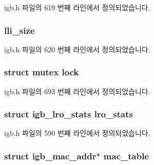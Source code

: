 igb.\+h 파일의 619 번째 라인에서 정의되었습니다.

\subsubsection[{\texorpdfstring{lli\+\_\+size}{lli_size}}]{ lli\+\_\+size}\hypertarget{structigb__adapter_a2316241ef54e8be665bac12c9da109c8}{}\label{structigb__adapter_a2316241ef54e8be665bac12c9da109c8}


igb.\+h 파일의 620 번째 라인에서 정의되었습니다.

\subsubsection[{\texorpdfstring{lock}{lock}}]{\setlength{\rightskip}{0pt plus 5cm}struct mutex lock}\hypertarget{structigb__adapter_af635d65f26e31c345ef21c333feb3910}{}\label{structigb__adapter_af635d65f26e31c345ef21c333feb3910}


igb.\+h 파일의 693 번째 라인에서 정의되었습니다.

\subsubsection[{\texorpdfstring{lro\+\_\+stats}{lro_stats}}]{\setlength{\rightskip}{0pt plus 5cm}struct {\bf igb\+\_\+lro\+\_\+stats} lro\+\_\+stats}\hypertarget{structigb__adapter_adccef94bf73d9d366e6a2c97c5b30e6a}{}\label{structigb__adapter_adccef94bf73d9d366e6a2c97c5b30e6a}


igb.\+h 파일의 590 번째 라인에서 정의되었습니다.

\subsubsection[{\texorpdfstring{mac\+\_\+table}{mac_table}}]{\setlength{\rightskip}{0pt plus 5cm}struct {\bf igb\+\_\+mac\+\_\+addr}$\ast$ mac\+\_\+table}\hypertarget{structigb__adapter_a4b3341ed630595db4fc04aed2927d2fe}{}\label{structigb__adapter_a4b3341ed630595db4fc04aed2927d2fe}


